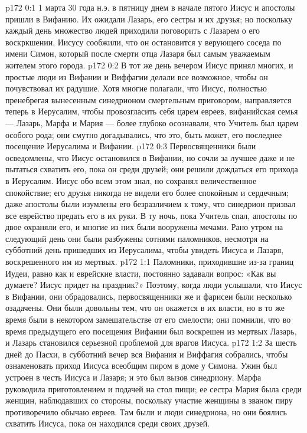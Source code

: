 \author{Комиссия срединников}
\vs p172 0:1 1 марта 30 года н.э. в пятницу днем в начале пятого Иисус и апостолы пришли в Вифанию. Их ожидали Лазарь, его сестры и их друзья; но поскольку каждый день множество людей приходили поговорить с Лазарем о его воскркшении, Иисусу сообжили, что он остановится у верующего соседа по имени Симон, который после смерти отца Лазаря был самым уважаемым жителем этого города.
\vs p172 0:2 В тот же день вечером Иисус принял многих, и простые люди из Вифании и Виффагии делали все возможное, чтобы он почувствовал их радушие. Хотя многие полагали, что Иисус, полностью пренебрегая вынесенным синедрионом смертельным приговором, направляется теперь в Иерусалим, чтобы провозгласить себя царем евреев, вифанийская семья --- Лазарь, Марфа и Мария --- более глубоко осознавали, что Учитель был царем особого рода; они смутно догадывались, что это, быть может, его последнее посещение Иерусалима и Вифании.
\vs p172 0:3 Первосвященники были осведомлены, что Иисус остановился в Вифании, но сочли за лучшее даже и не пытаться схватить его, пока он среди друзей; они решили дождаться его прихода в Иерусалим. Иисус обо всем этом знал, но сохранял величественное спокойствие; его друзья никогда не видели его более спокойным и сердечным; даже апостолы были изумлены его безразличием к тому, что синедрион призвал все еврейство предать его в их руки. В ту ночь, пока Учитель спал, апостолы по двое охраняли его, и многие из них были вооружены мечами. Рано утром на следующий день они были разбужены сотнями паломников, несмотря на субботний день пришедших из Иерусалима, чтобы увидеть Иисуса и Лазаря, воскрешенного им из мертвых.
\vs p172 1:1 Паломники, приходившие из\hyp{}за границ Иудеи, равно как и еврейские власти, постоянно задавали вопрос: «Как вы думаете? Иисус придет на праздник?» Поэтому, когда люди услышали, что Иисус в Вифании, они обрадовались, первосвященники же и фарисеи были несколько озадачены. Они были довольны тем, что он окажется в их власти, но в то же время были в некотором замешательстве от его смелости; они помнили, что во время предыдущего его посещения Вифании был воскрешен из мертвых Лазарь, и Лазарь становился серьезной проблемой для врагов Иисуса.
\vs p172 1:2 За шесть дней до Пасхи, в субботний вечер вся Вифания и Виффагия собрались, чтобы ознаменовать приход Иисуса всеобщим пиром в доме у Симона. Ужин был устроен в честь Иисуса и Лазаря; и это был вызов синедриону. Марфа руководила приготовлением и подачей на стол пищи; ее сестра Мария была среди женщин, наблюдавших со стороны, поскольку участие женщины в званом пиру противоречило обычаю евреев. Там были и люди синедриона, но они боялись схватить Иисуса, пока он находился среди своих друзей.
